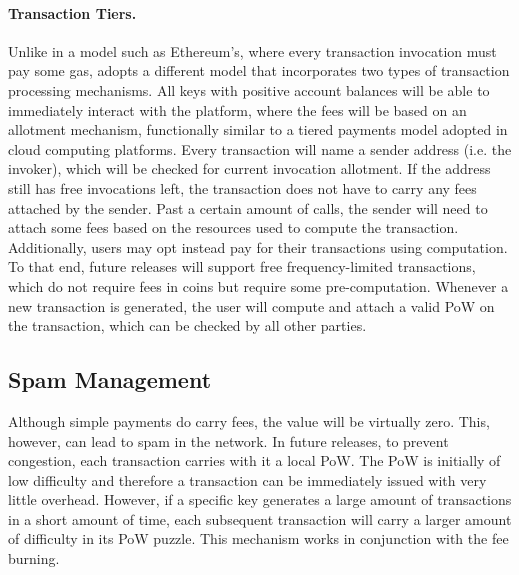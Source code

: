 \documentclass[runningheads]{llncs}
\begin{document}
\paragraph{Transaction Tiers.} Unlike in a model such as Ethereum's, where every transaction invocation must pay some gas, \AVAPlatformName{} adopts a different model that incorporates two types of transaction processing mechanisms. 
All keys with positive account balances will be able to immediately interact with the platform, where the fees will be based on an allotment mechanism, functionally similar to a tiered payments model adopted in cloud computing platforms. 
Every transaction will name a sender address (i.e. the invoker), which will be checked for current invocation allotment. 
If the address still has free invocations left, the transaction does not have to carry any fees attached by the sender. 
Past a certain amount of calls, the sender will need to attach some fees based on the resources used to compute the transaction. 
Additionally, users may opt instead pay for their transactions using computation. 
To that end, future releases will support free frequency-limited transactions, which do not require fees in coins but require some pre-computation. 
Whenever a new transaction is generated, the user will compute and attach a valid PoW on the transaction, which can be checked by all other parties.

\subsection{Spam Management}
Although simple payments do carry fees, the value will be virtually zero. This, however, can lead to spam in the network. 
In future releases, to prevent congestion, each transaction carries with it a local PoW. 
The PoW is initially of low difficulty and therefore a transaction can be immediately issued with very little overhead. 
However, if a specific key generates a large amount of transactions in a short amount of time, each subsequent transaction will carry a larger amount of difficulty in its PoW puzzle. 
This mechanism works in conjunction with the fee burning. 



\end{document}
